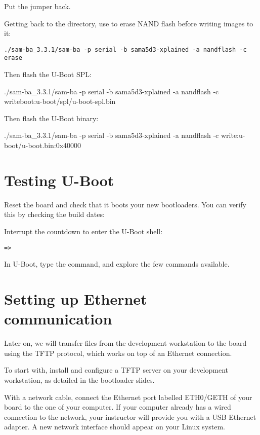 Put the jumper back.

Getting back to the  directory, use  to erase
NAND flash before writing images to it:

\begin{verbatim}
./sam-ba_3.3.1/sam-ba -p serial -b sama5d3-xplained -a nandflash -c erase
\end{verbatim}

Then flash the U-Boot SPL:

\begin{terminalinput}
./sam-ba_3.3.1/sam-ba -p serial -b sama5d3-xplained -a nandflash -c writeboot:u-boot/spl/u-boot-spl.bin
\end{terminalinput}

Then flash the U-Boot binary:

\begin{terminalinput}
./sam-ba_3.3.1/sam-ba -p serial -b sama5d3-xplained -a nandflash -c write:u-boot/u-boot.bin:0x40000
\end{terminalinput}

\section{Testing U-Boot}

Reset the board and check that it boots your new bootloaders. You can
verify this by checking the build dates:



Interrupt the countdown to enter the U-Boot shell:
\begin{verbatim}
=>
\end{verbatim}

In U-Boot, type the  command, and explore the few commands
available.

\section{Setting up Ethernet communication}

Later on, we will transfer files from the development workstation to
the board using the TFTP protocol, which works on top of an Ethernet
connection.

To start with, install and configure a TFTP server on your development
workstation, as detailed in the bootloader slides.

With a network cable, connect the Ethernet port labelled ETH0/GETH of
your board to the one of your computer. If your computer already has a
wired connection to the network, your instructor will provide you with
a USB Ethernet adapter. A new network interface should appear on your
Linux system.

